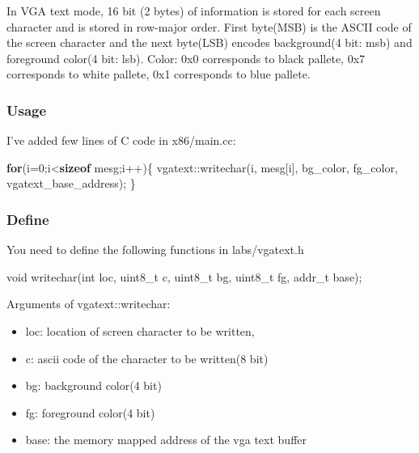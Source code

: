 \documentclass[]{book}
\newenvironment{Shaded}{}{}
\newcommand{\KeywordTok}[1]{\textbf{{#1}}}
\newcommand{\DataTypeTok}[1]{\textcolor[rgb]{0.50,0.00,0.00}{{#1}}}
\newcommand{\DecValTok}[1]{\textcolor[rgb]{0.00,0.00,1.00}{{#1}}}
\newcommand{\NormalTok}[1]{{#1}}
\begin{document}
In VGA text mode, 16 bit (2 bytes) of information is stored for each
screen character and is stored in row-major order. First byte(MSB) is
the ASCII code of the screen character and the next byte(LSB) encodes
background(4 bit: msb) and foreground color(4 bit: lsb). Color: 0x0
corresponds to black pallete, 0x7 corresponds to white pallete, 0x1
corresponds to blue pallete.

\subsubsection*{Usage}\label{usage}

I've added few lines of C code in x86/main.cc:

\begin{Shaded}
\begin{Highlighting}[]
       \KeywordTok{for}\NormalTok{(i=}\DecValTok{0}\NormalTok{;i<}\KeywordTok{sizeof} \NormalTok{mesg;i++)\{}
         \NormalTok{vgatext::writechar(i, mesg[i], bg_color, fg_color, vgatext_base_address);}
       \NormalTok{\}}
\end{Highlighting}
\end{Shaded}

\subsubsection*{Define}\label{define}

You need to define the following functions in labs/vgatext.h

\begin{Shaded}
\begin{Highlighting}[]
        \DataTypeTok{void} \NormalTok{writechar(}\DataTypeTok{int} \NormalTok{loc, }\DataTypeTok{uint8_t} \NormalTok{c, }\DataTypeTok{uint8_t} \NormalTok{bg, }\DataTypeTok{uint8_t} \NormalTok{fg, addr_t base);}
\end{Highlighting}
\end{Shaded}

Arguments of vgatext::writechar:

\begin{itemize}
\itemsep1pt\parskip0pt
\item
  loc: location of screen character to be written,
\item
  c: ascii code of the character to be written(8 bit)
\item
  bg: background color(4 bit)
\item
  fg: foreground color(4 bit)
\item
  base: the memory mapped address of the vga text buffer
\end{itemize}
\end{document}
